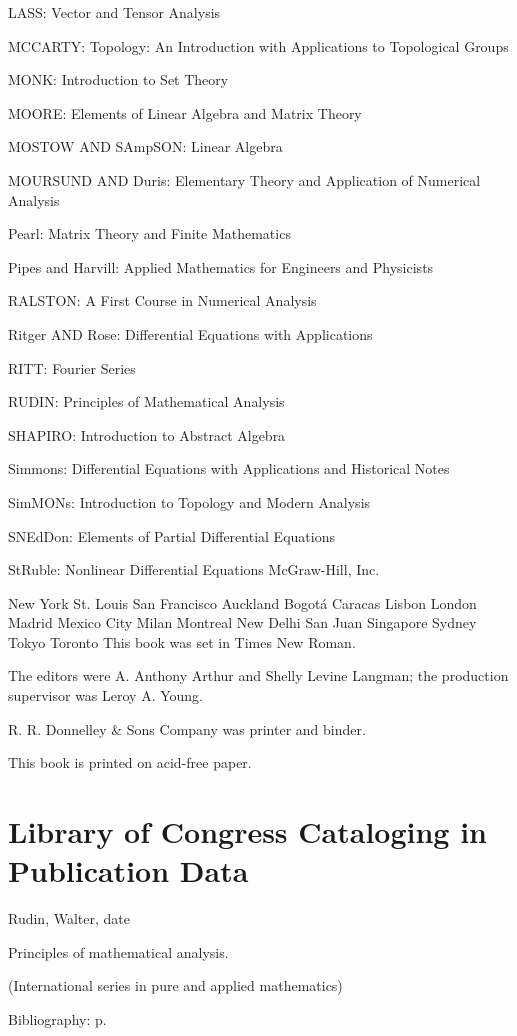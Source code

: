 \documentclass[10pt]{article}
\begin{document}
LASS: Vector and Tensor Analysis

MCCARTY: Topology: An Introduction with Applications to Topological Groups

MONK: Introduction to Set Theory

MOORE: Elements of Linear Algebra and Matrix Theory

MOSTOW AND SAmpSON: Linear Algebra

MOURSUND AND Duris: Elementary Theory and Application of Numerical Analysis

Pearl: Matrix Theory and Finite Mathematics

Pipes and Harvill: Applied Mathematics for Engineers and Physicists

RALSTON: A First Course in Numerical Analysis

Ritger AND Rose: Differential Equations with Applications

RITT: Fourier Series

RUDIN: Principles of Mathematical Analysis

SHAPIRO: Introduction to Abstract Algebra

Simmons: Differential Equations with Applications and Historical Notes

SimMONs: Introduction to Topology and Modern Analysis

SNEdDon: Elements of Partial Differential Equations

StRuble: Nonlinear Differential Equations McGraw-Hill, Inc.

New York St. Louis San Francisco Auckland Bogotá Caracas Lisbon London Madrid Mexico City Milan Montreal New Delhi San Juan Singapore Sydney Tokyo Toronto This book was set in Times New Roman.

The editors were A. Anthony Arthur and Shelly Levine Langman; the production supervisor was Leroy A. Young.

R. R. Donnelley \& Sons Company was printer and binder.

This book is printed on acid-free paper.

\section{Library of Congress Cataloging in Publication Data}
Rudin, Walter, date

Principles of mathematical analysis.

(International series in pure and applied mathematics)

Bibliography: p.
\end{document}
